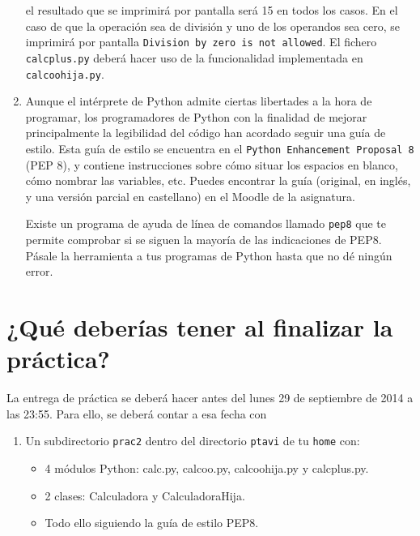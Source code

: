 \documentclass[11pt,a4paper]{article}
\newcommand{\finejercicio}{
  \begin{footnotesize}
    [Al terminar el ejercicio es recomendable hacer \texttt{commit} de los ficheros modificados]
  \end{footnotesize}
}
\newcommand{\finpractica}{
  \begin{footnotesize}
    [Al terminar la práctica, realiza un \texttt{push} para sincronizar tu repositorio GitHub]
  \end{footnotesize}
}
\renewcommand{\finejercicio}{
}
\renewcommand{\finpractica}{
}
\begin{document}
\begin{enumerate}
	el resultado que se imprimirá por pantalla será 15 en todos los casos. En el caso de que la operación sea de división y uno de los operandos sea cero, se imprimirá por pantalla \texttt{Division by zero is not allowed}. El fichero \texttt{calcplus.py} deberá hacer uso de la funcionalidad implementada en \texttt{calcoohija.py}.

\finejercicio

  \item Aunque el intérprete de Python admite ciertas libertades a la hora de programar, los programadores de Python con la finalidad de mejorar principalmente la legibilidad del código han acordado seguir una guía de estilo. Esta guía de estilo se encuentra en el \texttt{Python Enhancement Proposal 8} (PEP 8), y contiene instrucciones sobre cómo situar los espacios en blanco, cómo nombrar las variables, etc. Puedes encontrar la guía (original, en inglés, y una versión parcial en castellano) en el Moodle de la asignatura.

  Existe un programa de ayuda de línea de comandos llamado \texttt{pep8} que te permite comprobar si se siguen la mayoría de las indicaciones de PEP8. Pásale la herramienta a tus programas de Python hasta que no dé ningún error.

\finejercicio

\finpractica

\end{enumerate}

\section{¿Qué deberías tener al finalizar la práctica?}

La entrega de práctica se deberá hacer antes del lunes 29 de septiembre de 2014 a las 23:55. Para ello, se deberá contar a esa fecha con

\begin{enumerate}
  \item Un subdirectorio \texttt{prac2} dentro del directorio \texttt{ptavi} de tu \texttt{home} con:
  \begin{itemize}
    \item 4 módulos Python: calc.py, calcoo.py, calcoohija.py y calcplus.py.
    \item 2 clases: Calculadora y CalculadoraHija.
    \item Todo ello siguiendo la guía de estilo PEP8.
  \end{itemize}
\end{enumerate}
\end{document}
